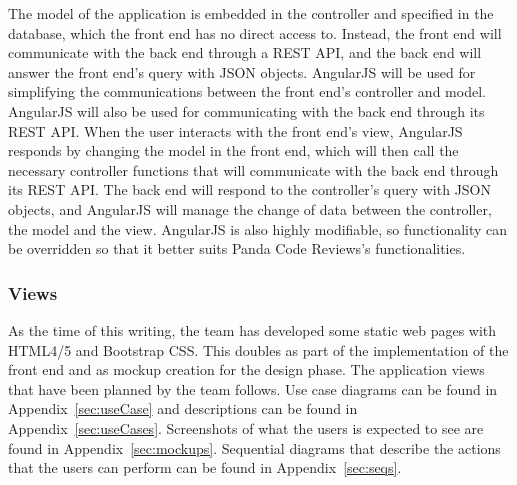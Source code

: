 The model of the application is embedded in the controller and specified in the
database, which the front end has no direct access to. Instead, the front end
will communicate with the back end through a REST API, and the back end will
answer the front end's query with JSON objects. AngularJS will be used for
simplifying the communications between the front end's controller and model.
AngularJS will also be used for communicating with the back end through its REST
API. When the user interacts with the front end's view, AngularJS responds by
changing the model in the front end, which will then call the necessary
controller functions that will communicate with the back end through its REST
API. The back end will respond to the controller's query with JSON objects, and
AngularJS will manage the change of data between the controller, the model and
the view. AngularJS is also highly modifiable, so functionality can be
overridden so that it better suits Panda Code Reviews's functionalities.

\subsubsection{Views}

As the time of this writing, the team has developed some static web pages with
HTML4/5 and Bootstrap CSS. This doubles as part of the implementation of the
front end and as mockup creation for the design phase. The application views
that have been planned by the team follows. Use case diagrams can be found in
Appendix~\ref{sec:useCase} and descriptions can be found in
Appendix~\ref{sec:useCases}. Screenshots of what the users is expected to see
are found in Appendix~\ref{sec:mockups}. Sequential diagrams that describe the
actions that the users can perform can be found in Appendix~\ref{sec:seqs}.

